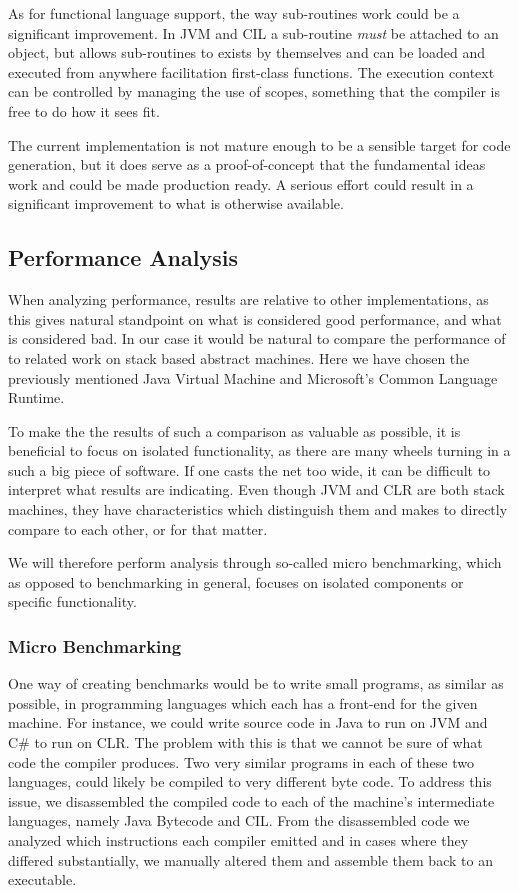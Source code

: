 As for functional language support, the way sub-routines work could be a
significant improvement. In JVM and CIL a sub-routine \emph{must} be attached to
an object, but \thename{} allows sub-routines to exists by themselves and can be
loaded and executed from anywhere facilitation first-class functions. The
execution context can be controlled by managing the use of scopes, something
that the compiler is free to do how it sees fit.

The current implementation is not mature enough to be a sensible target for code
generation, but it does serve as a proof-of-concept that the fundamental ideas
work and could be made production ready. A serious effort could result in a
significant improvement to what is otherwise available.

\subsection{Performance Analysis}
\label{sec:eval:performance}

When analyzing performance, results are relative to other implementations, as
this gives natural standpoint on what is considered good performance, and what
is considered bad. In our case it would be natural to compare the performance of
\thename{} to related work on stack based abstract machines. Here we have chosen
the previously mentioned Java Virtual Machine and Microsoft's Common Language
Runtime.

To make the the results of such a comparison as valuable as possible, it is
beneficial to focus on isolated functionality, as there are many wheels turning
in a such a big piece of software. If one casts the net too wide, it can be
difficult to interpret what results are indicating. Even though JVM and CLR are
both stack machines, they have characteristics which distinguish them and makes
to directly compare to each other, or \thename{} for that matter. %

We will therefore perform analysis through so-called micro benchmarking, which
as opposed to benchmarking in general, focuses on isolated components or
specific functionality.

\subsubsection{Micro Benchmarking}

One way of creating benchmarks would be to write small programs, as similar as
possible, in programming languages which each has a front-end for the given
machine. For instance, we could write source code in Java to run on JVM and C\#
to run on CLR. The problem with this is that we cannot be sure of what code the
compiler produces. Two very similar programs in each of these two languages,
could likely be compiled to very different byte code. To address this issue, we
disassembled the compiled code to each of the machine's intermediate languages,
namely Java Bytecode and CIL. From the disassembled code we analyzed which
instructions each compiler emitted and in cases where they differed
substantially, we manually altered them and assemble them back to an executable.

